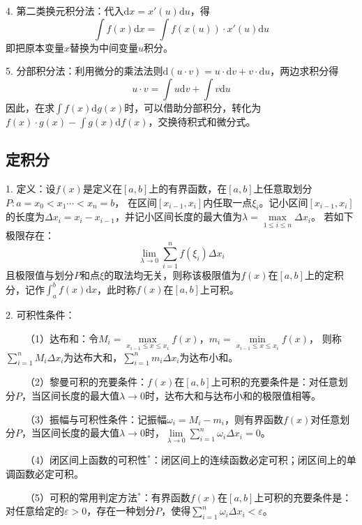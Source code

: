 4. 第二类换元积分法：代入$\mathrm{d}x =x'(u)\mathrm{d}u$，得
\begin{equation*}
    \int f(x)\mathrm{d} x =\int f\left(x(u)\right)\cdot x'(u)\mathrm{d} u 
\end{equation*}
即把原本变量$x$替换为中间变量$u$积分。

5. 分部积分法：利用微分的乘法法则$\mathrm{d}(u\cdot v)=u\cdot \mathrm{d}v +v\cdot \mathrm{d}u$，两边求积分得
\begin{equation*}
    u\cdot v =\int u \mathrm{d}v+\int v\mathrm{d}u
\end{equation*}
因此，在求$\int f(x)\mathrm{d} g(x)$时，可以借助分部积分，转化为$f(x)\cdot g(x)-\int g(x)\mathrm{d}f(x)$，交换待积式和微分式。

\subsection{定积分}

1. 定义：设$f(x)$是定义在$[a,b]$上的有界函数，在$[a,b]$上任意取划分$P:a=x_0<x_1\cdots<x_n=b$，
在区间$[x_{i-1},x_i]$内任取一点$\xi_i$。记小区间$[x_{i-1},x_i]$的长度为$\Delta x_i=x_i-x_{i-1}$，并记小区间长度的最大值为$\lambda=\max\limits_{1\leqslant i\leqslant n} \Delta x_i$。
若如下极限存在：
\begin{equation*}
    \lim\limits_{\lambda \rightarrow 0} \sum\limits_{i=1}^n f\left(\xi_i\right)\Delta x_i
\end{equation*}
且极限值与划分$P$和点$\xi$的取法均无关，则称该极限值为$f(x)$在$[a,b]$上的定积分，记作$\int_a^b f(x)\mathrm{d}x$，此时称$f(x)$在$[a,b]$上可积。

2. 可积性条件：

~~~~（1）达布和：令$M_i=\max\limits_{x_{i-1}\leqslant x\leqslant x_i}f(x)$，$m_i=\min\limits_{x_{i-1}\leqslant x\leqslant x_i}f(x)$，
则称$\sum\limits_{i=1}^n M_i\Delta x_i$为达布大和，$\sum\limits_{i=1}^n m_i\Delta x_i$为达布小和。

~~~~（2）黎曼可积的充要条件：$f(x)$在$[a,b]$上可积的充要条件是：对任意划分$P$，当区间长度的最大值$\lambda \rightarrow 0 $时，达布大和与达布小和的极限值相等。

~~~~（3）振幅与可积性条件：记振幅$\omega_i=M_i-m_i$，则有界函数$f(x)$对任意划分$P$，当区间长度的最大值$\lambda \rightarrow 0 $时，$\lim\limits_{\lambda \rightarrow 0}\sum\limits_{i=1}^n \omega_i\Delta x_i= 0$。

~~~~（4）闭区间上函数的可积性$^*$：闭区间上的连续函数必定可积；闭区间上的单调函数必定可积。

~~~~（5）可积的常用判定方法$^*$：有界函数$f(x)$在$[a,b]$上可积的充要条件是：对任意给定的$\varepsilon>0$，存在一种划分$P$，使得$\sum\limits_{i=1}^n \omega_i \Delta x_i <\varepsilon$。

